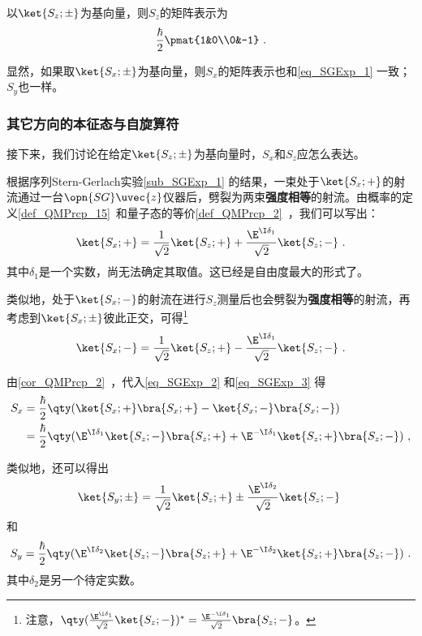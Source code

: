 以$\ket{S_z; \pm}$为基向量，则$S_z$的矩阵表示为
\begin{equation}\label{eq_SGExp_1}
\frac{\hbar}{2}\pmat{1&0\\0&-1}~.
\end{equation}


显然，如果取$\ket{S_x; \pm}$为基向量，则$S_x$的矩阵表示也和\autoref{eq_SGExp_1} 一致；$S_y$也一样。



\subsubsection{其它方向的本征态与自旋算符}


接下来，我们讨论在给定$\ket{S_z; \pm}$为基向量时，$S_x$和$S_z$应怎么表达。

根据序列Stern-Gerlach实验\autoref{sub_SGExp_1} 的结果，一束处于$\ket{S_x; +}$的射流通过一台$\opn{SG}\uvec{z}$仪器后，劈裂为两束\textbf{强度相等}的射流。由概率的定义\autoref{def_QMPrcp_15}~和量子态的等价\autoref{def_QMPrcp_2}~，我们可以写出：
\begin{equation}\label{eq_SGExp_2}
\ket{S_x; +}=\frac{1}{\sqrt{2}}\ket{S_z; +}+\frac{\E^{\I \delta_1}}{\sqrt{2}}\ket{S_z; -}~.
\end{equation}
其中$\delta_1$是一个实数，尚无法确定其取值。这已经是自由度最大的形式了。

类似地，处于$\ket{S_x; -}$的射流在进行$S_z$测量后也会劈裂为\textbf{强度相等}的射流，再考虑到$\ket{S_x; \pm}$彼此正交，可得\footnote{注意，$\qty(\frac{\E^{\I \delta_1}}{\sqrt{2}}\ket{S_z; -})^*=\frac{\E^{-\I \delta_1}}{\sqrt{2}}\bra{S_z; -}$。}
\begin{equation}\label{eq_SGExp_3}
\ket{S_x; -}=\frac{1}{\sqrt{2}}\ket{S_z; +}-\frac{\E^{\I \delta_1}}{\sqrt{2}}\ket{S_z; -}~.
\end{equation}


由\autoref{cor_QMPrcp_2}~，代入\autoref{eq_SGExp_2} 和\autoref{eq_SGExp_3} 得
\begin{equation}\label{eq_SGExp_4}
\begin{aligned}
S_x &= \frac{\hbar}{2}\qty(\ket{S_x; +}\bra{S_x; +}-\ket{S_x; -}\bra{S_x; -})\\
&=\frac{\hbar}{2}\qty(\E^{\I\delta_1}\ket{S_z; -}\bra{S_z; +} + \E^{-\I\delta_1}\ket{S_z; +}\bra{S_z; -})~,
\end{aligned}
\end{equation}

类似地，还可以得出
\begin{equation}\label{eq_SGExp_7}
\ket{S_y; \pm} = \frac{1}{\sqrt{2}}\ket{S_z; +}\pm\frac{\E^{\I\delta_2}}{\sqrt{2}}\ket{S_z; -}~
\end{equation}
和
\begin{equation}\label{eq_SGExp_5}
S_y=\frac{\hbar}{2}\qty(\E^{\I\delta_2}\ket{S_z; -}\bra{S_z; +} + \E^{-\I\delta_2}\ket{S_z; +}\bra{S_z; -})~.
\end{equation}
其中$\delta_2$是另一个待定实数。

